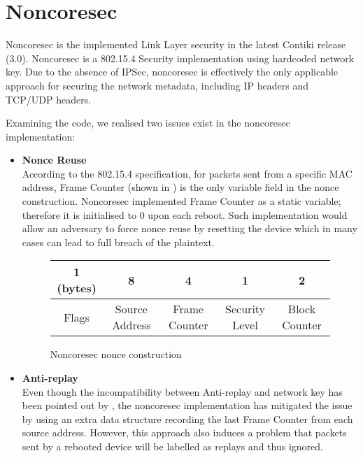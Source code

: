 \section{Noncoresec \label{noncoresec}}
Noncoresec\cite{noncoresec} is the implemented Link Layer\cite{OSI} security in the latest Contiki release (3.0). Noncoresec is a 802.15.4 Security\cite{802154} implementation using hardcoded network key. Due to the absence of IPSec\cite{rfc4301}, noncoresec is effectively the only applicable approach for securing the network metadata, including IP headers and TCP/UDP headers.


Examining the code, we realised two issues exist in the noncoresec implementation:
\begin{itemize}
	\item \textbf{Nonce Reuse} \\
	According to the 802.15.4 specification\cite{802154}, for packets sent from a specific MAC address, Frame Counter (shown in ) is the only variable field in the nonce construction. Noncoresec implemented Frame Counter as a static variable; therefore it is initialised to 0 upon each reboot. Such implementation would allow an adversary to force nonce reuse by resetting the device which in many cases can lead to full breach of the plaintext.
	
	\begin{figure}[th!]
	\centering
	{
		\begin{tabular}{|c|c|c|c|c|}
			\hline 
			1 (bytes) & 8              & 4             & 1              & 2             \\ \hline
			Flags      & Source Address & Frame Counter & Security Level & Block Counter \\ \hline
		\end{tabular}
	}
	\caption{Noncoresec nonce construction}
	\label{NoncoresecNonce}
	\end{figure}
	
	\item \textbf{Anti-replay} \\
	Even though the incompatibility between Anti-replay and network key has been pointed out by \cite{802154SecIssues}, the noncoresec implementation has mitigated the issue by using an extra data structure recording the last Frame Counter from each source address. However, this approach also induces a problem that packets sent by a rebooted device will be labelled as replays and thus ignored.
\end{itemize}


